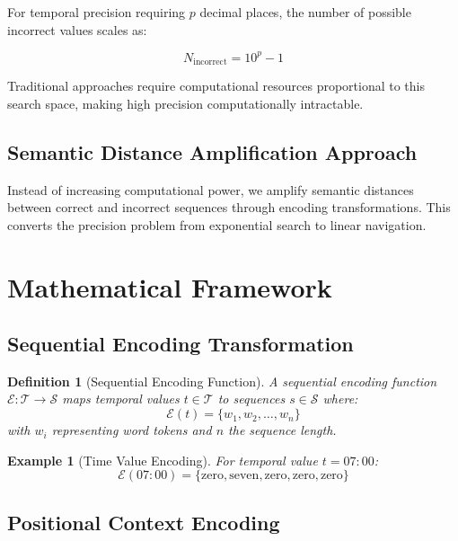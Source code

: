 \documentclass[12pt,a4paper]{article}
\newtheorem{definition}{Definition}
\newtheorem{example}{Example}
\begin{document}
For temporal precision requiring $p$ decimal places, the number of possible incorrect values scales as:

\begin{equation}
N_{\text{incorrect}} = 10^p - 1
\end{equation}

Traditional approaches require computational resources proportional to this search space, making high precision computationally intractable.

\subsection{Semantic Distance Amplification Approach}

Instead of increasing computational power, we amplify semantic distances between correct and incorrect sequences through encoding transformations. This converts the precision problem from exponential search to linear navigation.

\section{Mathematical Framework}

\subsection{Sequential Encoding Transformation}

\begin{definition}[Sequential Encoding Function]
A sequential encoding function $\mathcal{E}: \mathcal{T} \to \mathcal{S}$ maps temporal values $t \in \mathcal{T}$ to sequences $s \in \mathcal{S}$ where:
\begin{equation}
\mathcal{E}(t) = \{w_1, w_2, \ldots, w_n\}
\end{equation}
with $w_i$ representing word tokens and $n$ the sequence length.
\end{definition}

\begin{example}[Time Value Encoding]
For temporal value $t = 07:00$:
\begin{equation}
\mathcal{E}(07:00) = \{\text{zero}, \text{seven}, \text{zero}, \text{zero}, \text{zero}\}
\end{equation}
\end{example}

\subsection{Positional Context Encoding}
\end{document}
